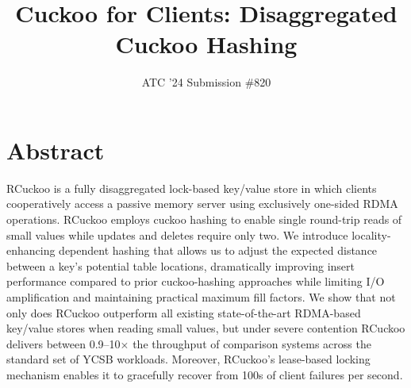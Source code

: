 \documentclass[10pt,twocolumn]{article}
\begin{document}
\title{Cuckoo for Clients: Disaggregated Cuckoo Hashing}
\author{ATC '24 Submission \#820}
\date{}

\maketitle

\section*{Abstract}


RCuckoo is a fully disaggregated lock-based key/value store in which
clients cooperatively access a passive memory server using exclusively
one-sided RDMA operations.  RCuckoo employs cuckoo hashing to enable
single round-trip reads of small values while updates and deletes
require only two.  We introduce locality-enhancing dependent hashing
that allows us to adjust the expected distance between a key's
potential table locations, dramatically improving insert performance
compared to prior cuckoo-hashing approaches while limiting I/O
amplification and maintaining practical maximum fill factors.  We show
that not only does RCuckoo outperform all existing
state-of-the-art RDMA-based key/value stores when reading small values, but under
severe contention RCuckoo delivers between 0.9--10$\times$ the throughput
of comparison systems across the standard set of YCSB workloads.  Moreover,
RCuckoo's lease-based locking mechanism enables it to gracefully
recover from 100s of client failures per second.

\end{document}
